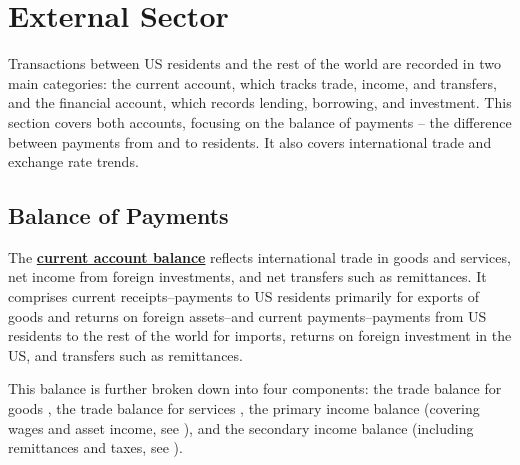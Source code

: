\section*{External Sector}
\thispagestyle{sectpage}
\begin{minipage}{0.76\textwidth}
\small Transactions between US residents and the rest of the world are recorded in two main categories: the current account, which tracks trade, income, and transfers, and the financial account, which records lending, borrowing, and investment. This section covers both accounts, focusing on the balance of payments -- the difference between payments from and to residents. It also covers international trade and exchange rate trends.

\hypertarget{exbop}{\label{exbop}}
\subsection*{Balance of Payments}  
\small The \textbf{\href{https://www.bea.gov/help/glossary/balance-current-account-national-income-and-product-accounts}{current account balance}} reflects international trade in goods and services, net income from foreign investments, and net transfers such as remittances. It comprises current receipts--payments to US residents primarily for exports of goods and returns on foreign assets--and current payments--payments from US residents to the rest of the world for imports, returns on foreign investment in the US, and transfers such as remittances. 

This balance is further broken down into four components: the trade balance for goods , the trade balance for services , the primary income balance (covering wages and asset income, see ), and the secondary income balance (including remittances and taxes, see ).  

 
\vspace{1mm}

\vspace{5.2cm}

\hspace{5mm} 


\end{minipage}

